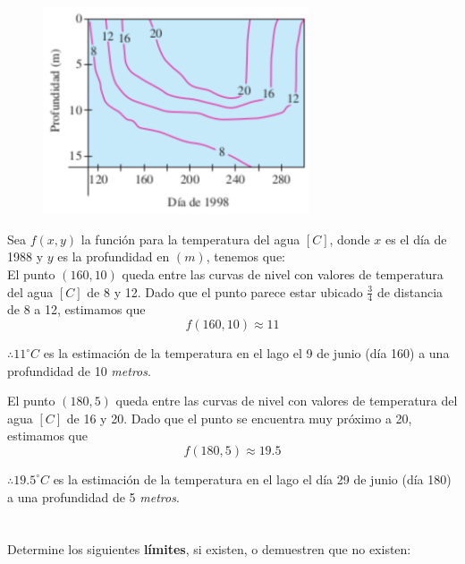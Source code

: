 \documentclass[12pt]{article}
\begin{document}
\begin{figure}[H]
  \centering
  \includegraphics[width=0.7\textwidth]{./img/t3_ej2.png}
\end{figure}

Sea $f(x, y)$ la función para la temperatura del agua $[C]$, donde $x$ es el día de 1988 y $y$ es la profundidad en $(m)$, tenemos que: \\

El punto $(160,10)$ queda entre las curvas de nivel con valores de temperatura del agua $[C]$ de 8 y 12. Dado que el punto parece estar ubicado $\frac{3}{4}$ de distancia de 8 a 12, estimamos que $$f(160,10) \approx 11$$

$\therefore {11}^\circ C$ es la estimación de la temperatura en el lago el 9 de junio (día 160) a una profundidad de 10 \textit{metros}.

El punto $(180,5)$ queda entre las curvas de nivel con valores de temperatura del agua $[C]$ de 16 y 20. Dado que el punto se encuentra muy próximo a 20, estimamos que $$f(180,5) \approx 19.5$$

$\therefore {19.5}^\circ C$ es la estimación de la temperatura en el lago el día 29 de junio (día 180) a una profundidad de 5 \textit{metros}.

\section{}

Determine los siguientes \textbf{límites}, si existen, o demuestren que no existen:
\end{document}
